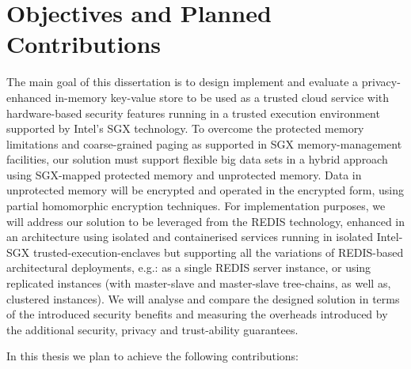 \section{Objectives and Planned Contributions} %
\label{sec:objectives_and_planned_contributions}

The main goal of this dissertation is to design implement and evaluate a privacy-enhanced in-memory key-value store to be used as a trusted cloud service with hardware-based security features running in a trusted execution environment supported by Intel’s \gls{SGX} technology. To overcome the protected memory limitations and coarse-grained paging as supported in SGX memory-management facilities, our solution must support flexible big data sets in a hybrid approach using SGX-mapped protected memory and unprotected memory. Data in unprotected memory will be encrypted and operated in the encrypted form, using partial homomorphic encryption techniques.
For implementation purposes, we will address our solution to be leveraged from the REDIS technology, enhanced in an architecture using isolated and containerised services running in isolated Intel-SGX trusted-execution-enclaves but supporting all the variations of REDIS-based architectural deployments, e.g.: as a single REDIS server instance, or using replicated instances (with master-slave and master-slave tree-chains, as well as, clustered instances). We will analyse and compare the designed solution in terms of the introduced security benefits and measuring the overheads introduced by the additional security, privacy and trust-ability guarantees.

In this thesis we plan to achieve the following contributions:

